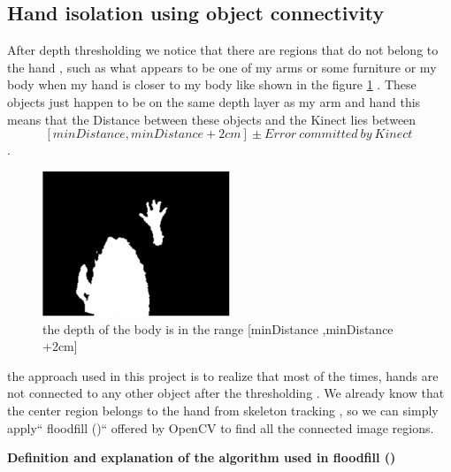 \subsection{Hand isolation using object connectivity }

After depth thresholding we notice that there are regions that do not belong to the hand , such as what appears to be one of my  arms or some furniture or my body when my hand is closer to my body like shown in the figure  \ref{fig:cam10} . These objects just happen to be on the same depth layer as my arm and hand this means that the Distance between these objects and the Kinect lies  between \textbf{ $$[minDistance ,minDistance +2cm] \pm {Error\ committed\ by\ Kinect\ } $$ } .


\begin{figure}[H]
\centering
\includegraphics[width=0.5\textwidth]{img/depththresholding.png}
\caption{the depth of the body is in  the range [minDistance ,minDistance +2cm]}
\label{fig:cam10}
\end{figure}

the approach used in this project  is to realize that most of the times, hands are not connected to any other object after the thresholding . We already know that the center region belongs to the hand from skeleton tracking , so we can simply apply`` floodfill ()`` offered by OpenCV to find all the connected image regions.\newline

\textbf{ Definition and explanation of the algorithm used in floodfill () }

